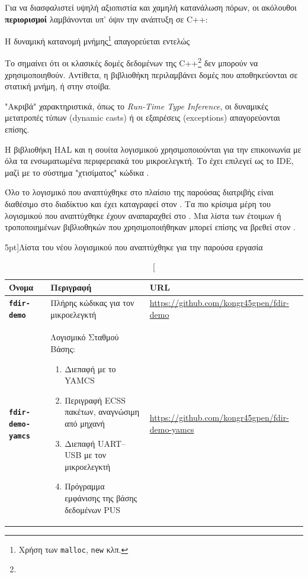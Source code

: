 \documentclass[a4paper,nobib]{tufte-book}
\begin{document}
Για να διασφαλιστεί υψηλή αξιοπιστία και χαμηλή κατανάλωση πόρων, οι ακόλουθοι \textbf{περιορισμοί} λαμβάνονται υπ' όψιν την ανάπτυξη σε C++:
\begin{compactenum}
	\item Η δυναμική κατανομή μνήμης\footnote{Χρήση των \texttt{malloc}, \texttt{new} κλπ.} απαγορεύεται εντελώς
	\label{itm:malloc}
	\item Το  σημαίνει ότι οι κλασικές δομές δεδομένων της C++\footnote{} δεν μπορούν να χρησιμοποιηθούν. Αντίθετα, η βιβλιοθήκη  περιλαμβάνει δομές που αποθηκεύονται σε στατική μνήμη, ή στην στοίβα.
	\item "Ακριβά" χαρακτηριστικά, όπως το \emph{Run-Time Type Inference}, οι δυναμικές μετατροπές τύπων (dynamic casts) ή οι εξαιρέσεις (exceptions) απαγορεύονται επίσης.
\end{compactenum}

Η βιβλιοθήκη \ac{HAL} και η σουίτα λογισμικού   χρησιμοποιούνται για την επικοινωνία με όλα τα ενσωματωμένα περιφερειακά του μικροελεγκτή. Το  έχει επιλεγεί ως το \acs{IDE}, μαζί με το σύστημα "χτισίματος" κώδικα .

Όλο το λογισμικό που αναπτύχθηκε στο πλαίσιο της παρούσας διατριβής είναι διαθέσιμο στο διαδίκτυο και έχει καταγραφεί στον . Τα πιο κρίσιμα μέρη του λογισμικού που αναπτύχθηκε έχουν αναπαραχθεί στο . Μια λίστα των έτοιμων ή τροποποιημένων βιβλιοθηκών που χρησιμοποιήθηκαν μπορεί επίσης να βρεθεί στον .


\begin{table}[h]
	\centering
	\caption[][5pt]{Λίστα του νέου λογισμικού που αναπτύχθηκε για την παρούσα εργασία}
	\label{tab:new_software}
	\begin{tabularx}{\textwidth}{@{}lXp{6cm}@{}}
		\toprule
		Όνομα & Περιγραφή & URL \\ \midrule
		\textbf{\texttt{fdir-demo}} & Πλήρης κώδικας για τον μικροελεγκτή  & \small \url{https://github.com/kongr45gpen/fdir-demo} \\
		\textbf{\texttt{fdir-demo-yamcs}} & Λογισμικό Σταθμού Βάσης: \begin{enumerate}
			\item Διεπαφή με το \acs{YAMCS}
			\item Περιγραφή \acs{ECSS} πακέτων, αναγνώσιμη από μηχανή
			\item Διεπαφή \acs{UART}--\acs{USB} με τον μικροελεγκτή
			\item Πρόγραμμα εμφάνισης της βάσης δεδομένων \acs{PUS}\vspace*{-2ex}
			\end{enumerate} & \small \url{https://github.com/kongr45gpen/fdir-demo-yamcs} \\
		\bottomrule
	\end{tabularx}
\end{table}
\end{document}
